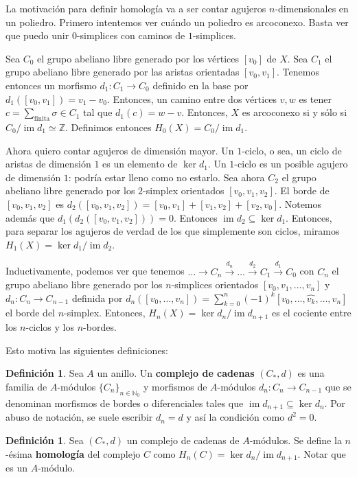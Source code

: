 \documentclass[12pt]{book}
\theoremstyle{definition}
\newtheorem{defn}[teo]{Definición}
\newcommand{\ZZ}{\mathbb{Z}}      %
\newcommand{\NN}{\mathbb{N}}
\DeclareMathOperator{\im}{im}
\begin{document}
La motivación para definir homología va a ser contar agujeros $n$-dimensionales en un poliedro. Primero intentemos ver cuándo un poliedro es arcoconexo. Basta ver que puedo unir $0$-simplices con caminos de $1$-simplices.

Sea $C_0$ el grupo abeliano libre generado por los vértices $[v_0]$ de $X$. Sea $C_1$ el grupo abeliano libre generado por las aristas orientadas $[v_0,v_1]$. Tenemos entonces un morfismo $d_1:C_1\to C_0$ definido en la base por $d_1([v_0,v_1]) = v_1-v_0$. Entonces, un camino entre dos vértices $v,w$ es tener $c=\displaystyle\sum_{\text{finita}} \sigma\in C_1$ tal que $d_1(c)=w-v$. Entonces, $X$ es arcoconexo si y sólo si $C_0/\im d_1 \simeq \ZZ$. Definimos entonces $H_0(X) = C_0/\im d_1$.

Ahora quiero contar agujeros de dimensión mayor. Un $1$-ciclo, o sea, un ciclo de aristas de dimensión $1$ es un elemento de $\ker d_1$. Un $1$-ciclo es un posible agujero de dimensión $1$: podría estar lleno como no estarlo. Sea ahora $C_2$ el grupo abeliano libre generado por los $2$-simplex orientados $[v_0,v_1,v_2]$. El borde de $[v_0,v_1,v_2]$ es $d_2([v_0,v_1,v_2])=[v_0,v_1]+[v_1,v_2]+[v_2,v_0]$. Notemos además que $d_1(d_2([v_0,v_1,v_2])) = 0$. Entonces $\im d_2\subseteq \ker d_1$. Entonces, para separar los agujeros de verdad de los que simplemente son ciclos, miramos $H_1(X) = \ker d_1/\im d_2$.

Inductivamente, podemos ver que tenemos $\ldots\longrightarrow C_n\stackrel{d_n}{\longrightarrow}\ldots \stackrel{d_2}{\longrightarrow}C_1\stackrel{d_1}{\longrightarrow}C_0$ con $C_n$ el grupo abeliano libre generado por los $n$-simplices orientados $[v_0,v_1,\ldots , v_n]$ y $d_n:C_n\to C_{n-1}$ definida por $d_n([v_0,\ldots , v_n])=\displaystyle\sum_{k=0}^n (-1)^k [v_0,\ldots , \hat{v_k},\ldots , v_n]$ el borde del $n$-simplex. Entonces, $H_n(X) = \ker d_n/\im d_{n+1}$ es el cociente entre los $n$-ciclos y los $n$-bordes.

Esto motiva las siguientes definiciones:

\begin{defn}
Sea $A$ un anillo. Un \textbf{complejo de cadenas} $(C_*,d)$ es una familia de $A$-módulos $\{C_n\}_{n\in\NN_0}$ y morfismos de $A$-módulos $d_n:C_n\to C_{n-1}$ que se denominan morfismos de bordes o diferenciales tales que $\im d_{n+1}\subseteq \ker d_n$. Por abuso de notación, se suele escribir $d_n=d$ y así la condición como $d^2 = 0$.
\end{defn}

\begin{defn}
Sea $(C_*,d)$ un complejo de cadenas de $A$-módulos. Se define la $n$-ésima \textbf{homología} del complejo $C$ como $H_n(C) = \ker d_n/\im d_{n+1}$. Notar que es un $A$-módulo.
\end{defn}
\end{document}
